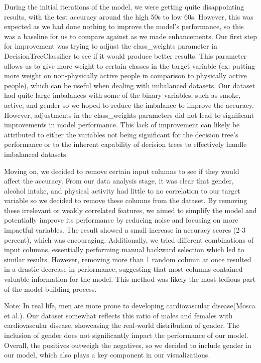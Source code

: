 ﻿\documentclass[12pt]{article}
\begin{document}
During the initial iterations of the model, we were getting quite disappointing results, with the test accuracy around the high 50s to low 60s. However, this was expected as we had done nothing to improve the model’s performance, so this was a baseline for us to compare against as we made enhancements.
Our first step for improvement was trying to adjust the class\_weights parameter in DecisionTreeClassifier to see if it would produce better results. This parameter allows us to give more weight to certain classes in the target variable (ex: putting more weight on non-physically active people in comparison to physically active people), which can be useful when dealing with imbalanced datasets. Our dataset had quite large imbalances with some of the binary variables, such as smoke, active, and gender so we hoped to reduce the imbalance to improve the accuracy. However, adjustments in the class\_weights parameters did not lead to significant improvements in model performance. This lack of improvement can likely be attributed to either the variables not being significant for the decision tree's performance or to the inherent capability of decision trees to effectively handle imbalanced datasets.

Moving on, we decided to remove certain input columns to see if they would affect the accuracy. From our data analysis stage, it was clear that gender, alcohol intake, and physical activity had little to no correlation to our target variable so we decided to remove these columns from the dataset. By removing these irrelevant or weakly correlated features, we aimed to simplify the model and potentially improve its performance by reducing noise and focusing on more impactful variables. The result showed a small increase in accuracy scores (2-3 percent), which was encouraging. Additionally, we tried different combinations of input columns, essentially performing manual backward selection which led to similar results. However, removing more than 1 random column at once resulted in a drastic decrease in performance, suggesting that most columns contained valuable information for the model. This method was likely the most tedious part of the model-building process. 

Note: In real life, men are more prone to developing cardiovascular disease(Mosca et al.). Our dataset somewhat reflects this ratio of males and females with cardiovascular disease, showcasing the real-world distribution of gender. The inclusion of gender does not significantly impact the performance of our model. Overall, the positives outweigh the negatives, so we decided to include gender in our model, which also plays a key component in our visualizations.
\end{document}
